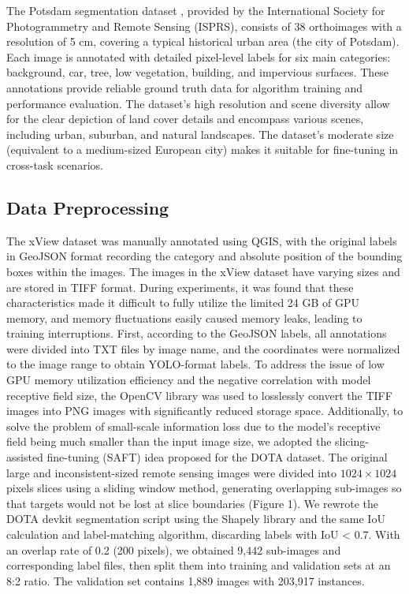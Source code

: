 \documentclass{article}
\begin{document}
The Potsdam segmentation dataset \cite{isprs2018benchmark}, provided by the International 
Society for Photogrammetry and Remote Sensing (ISPRS), consists of 
38 orthoimages with a resolution of 5 cm, covering a typical historical 
urban area (the city of Potsdam). Each image is annotated with detailed 
pixel-level labels for six main categories: background, car, tree, 
low vegetation, building, and impervious surfaces. These annotations 
provide reliable ground truth data for algorithm training and performance 
evaluation. The dataset's high resolution and scene diversity allow 
for the clear depiction of land cover details and encompass various 
scenes, including urban, suburban, and natural landscapes. The dataset's 
moderate size (equivalent to a medium-sized European city) makes it 
suitable for fine-tuning in cross-task scenarios.

\subsection{Data Preprocessing}
The xView dataset was manually annotated using QGIS, with the original 
labels in GeoJSON format recording the category and absolute position 
of the bounding boxes within the images. The images in the xView dataset 
have varying sizes and are stored in TIFF format. During experiments, 
it was found that these characteristics made it difficult to fully utilize 
the limited 24 GB of GPU memory, and memory fluctuations easily caused 
memory leaks, leading to training interruptions. First, according to 
the GeoJSON labels, all annotations were divided into TXT files by 
image name, and the coordinates were normalized to the image range 
to obtain YOLO-format labels. To address the issue of low GPU memory 
utilization efficiency and the negative correlation with model 
receptive field size, the OpenCV library was used to losslessly convert 
the TIFF images into PNG images with significantly reduced storage space. 
Additionally, to solve the problem of small-scale information loss due 
to the model's receptive field being much smaller than the input image 
size, we adopted the slicing-assisted fine-tuning (SAFT) idea proposed 
for the DOTA dataset. The original large and inconsistent-sized remote 
sensing images were divided into $1024 \times 1024$ pixels slices using a 
sliding window method, generating overlapping sub-images so that targets 
would not be lost at slice boundaries (Figure 1). We rewrote the DOTA 
devkit segmentation script using the Shapely library and the same IoU 
calculation and label-matching algorithm, discarding labels with IoU < 0.7. 
With an overlap rate of 0.2 (200 pixels), we obtained 9,442 sub-images and 
corresponding label files, then split them into training and validation 
sets at an 8:2 ratio. The validation set contains 1,889 images with 
203,917 instances.
\end{document}
